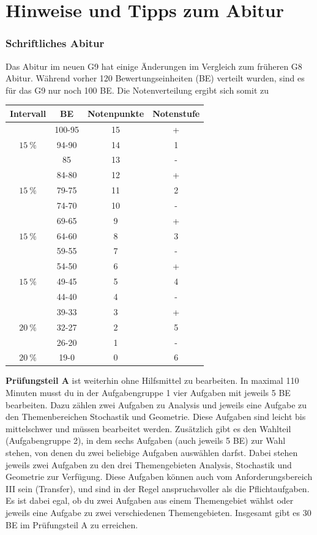 \documentclass[ngerman, 12pt]{nssheetxea}
\begin{document}
\section*{Hinweise und Tipps zum Abitur}
\subsubsection*{Schriftliches Abitur}
Das Abitur im neuen G9 hat einige Änderungen im Vergleich zum früheren G8 Abitur. Während vorher 120 Bewertungseinheiten (BE) verteilt wurden, sind es für das G9 nur noch 100 BE. Die Notenverteilung ergibt sich somit zu
\begin{center}
\begin{tabular}{c c c c}
\toprule
Intervall & BE & Notenpunkte & Notenstufe \\
\midrule
 & 100-95 & 15 & + \\
$\SI{15}{\percent}$ & 94-90 & 14 & 1 \\
 & 85 & 13 & - \\
 \midrule 
 & 84-80 & 12 & + \\
$\SI{15}{\percent}$ & 79-75 & 11 & 2 \\
 & 74-70 & 10 & - \\
 \midrule 
 & 69-65 & 9 & + \\
$\SI{15}{\percent}$ & 64-60 & 8 & 3 \\
 & 59-55 & 7 & - \\
 \midrule 
 & 54-50 & 6 & + \\
$\SI{15}{\percent}$ & 49-45 & 5 & 4 \\
 & 44-40 & 4 & - \\
 \midrule    
 & 39-33 & 3 & + \\
$\SI{20}{\percent}$ & 32-27 & 2 & 5 \\
 & 26-20 & 1 & - \\
 \midrule  
$\SI{20}{\percent}$ & 19-0 & 0 & 6 \\
\bottomrule
\end{tabular}
\end{center}
\textbf{Prüfungsteil A} ist weiterhin ohne Hilfsmittel zu bearbeiten. In maximal 110 Minuten musst du in der Aufgabengruppe 1 vier Aufgaben mit jeweils 5 BE bearbeiten. Dazu zählen zwei Aufgaben zu Analysis und jeweils eine Aufgabe zu den Themenbereichen Stochastik und Geometrie. Diese Aufgaben sind leicht bis mittelschwer und müssen bearbeitet werden. Zusätzlich gibt es den Wahlteil (Aufgabengruppe 2), in dem sechs Aufgaben (auch jeweils 5 BE) zur Wahl stehen, von denen du zwei beliebige Aufgaben auswählen darfst. Dabei stehen jeweils zwei Aufgaben zu den drei Themengebieten Analysis, Stochastik und Geometrie zur Verfügung. Diese Aufgaben können auch vom Anforderungsbereich III sein (Transfer), und sind in der Regel anspruchsvoller als die Pflichtaufgaben. Es ist dabei egal, ob du zwei Aufgaben aus einem Themengebiet wählst oder jeweils eine Aufgabe zu zwei verschiedenen Themengebieten. Insgesamt gibt es 30 BE im Prüfungsteil A zu erreichen. \par
\end{document}
